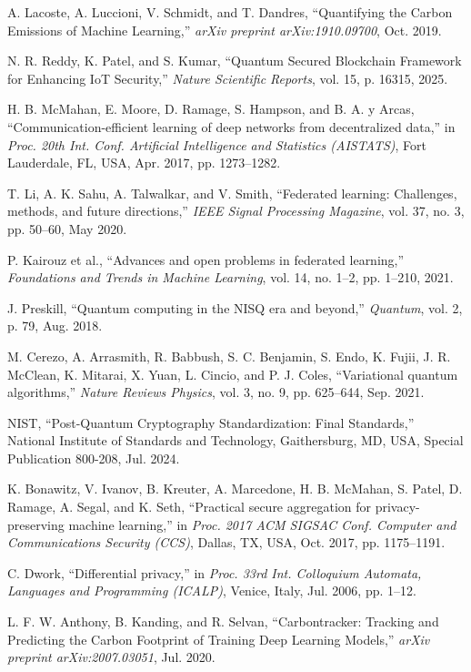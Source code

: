 \documentclass[10pt,journal,compsoc]{IEEEtran}
\begin{document}
\begin{thebibliography}{40}
A. Lacoste, A. Luccioni, V. Schmidt, and T. Dandres, ``Quantifying the Carbon Emissions of Machine Learning,'' \textit{arXiv preprint arXiv:1910.09700}, Oct. 2019.

N. R. Reddy, K. Patel, and S. Kumar, ``Quantum Secured Blockchain Framework for Enhancing IoT Security,'' \textit{Nature Scientific Reports}, vol. 15, p. 16315, 2025.

H. B. McMahan, E. Moore, D. Ramage, S. Hampson, and B. A. y Arcas, ``Communication-efficient learning of deep networks from decentralized data,'' in \textit{Proc. 20th Int. Conf. Artificial Intelligence and Statistics (AISTATS)}, Fort Lauderdale, FL, USA, Apr. 2017, pp. 1273--1282.

T. Li, A. K. Sahu, A. Talwalkar, and V. Smith, ``Federated learning: Challenges, methods, and future directions,'' \textit{IEEE Signal Processing Magazine}, vol. 37, no. 3, pp. 50--60, May 2020.

P. Kairouz et al., ``Advances and open problems in federated learning,'' \textit{Foundations and Trends in Machine Learning}, vol. 14, no. 1--2, pp. 1--210, 2021.

J. Preskill, ``Quantum computing in the NISQ era and beyond,'' \textit{Quantum}, vol. 2, p. 79, Aug. 2018.

M. Cerezo, A. Arrasmith, R. Babbush, S. C. Benjamin, S. Endo, K. Fujii, J. R. McClean, K. Mitarai, X. Yuan, L. Cincio, and P. J. Coles, ``Variational quantum algorithms,'' \textit{Nature Reviews Physics}, vol. 3, no. 9, pp. 625--644, Sep. 2021.

NIST, ``Post-Quantum Cryptography Standardization: Final Standards,'' National Institute of Standards and Technology, Gaithersburg, MD, USA, Special Publication 800-208, Jul. 2024.

K. Bonawitz, V. Ivanov, B. Kreuter, A. Marcedone, H. B. McMahan, S. Patel, D. Ramage, A. Segal, and K. Seth, ``Practical secure aggregation for privacy-preserving machine learning,'' in \textit{Proc. 2017 ACM SIGSAC Conf. Computer and Communications Security (CCS)}, Dallas, TX, USA, Oct. 2017, pp. 1175--1191.

C. Dwork, ``Differential privacy,'' in \textit{Proc. 33rd Int. Colloquium Automata, Languages and Programming (ICALP)}, Venice, Italy, Jul. 2006, pp. 1--12.

L. F. W. Anthony, B. Kanding, and R. Selvan, ``Carbontracker: Tracking and Predicting the Carbon Footprint of Training Deep Learning Models,'' \textit{arXiv preprint arXiv:2007.03051}, Jul. 2020.


\end{thebibliography}
\end{document}
